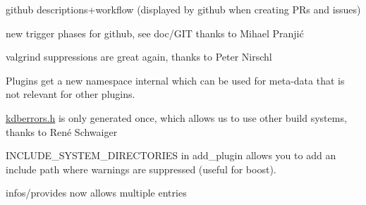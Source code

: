 \begin{DoxyItemize}
\item github descriptions+workflow (displayed by github when creating P\+Rs and issues)
\item new trigger phases for github, see doc/\+G\+IT thanks to Mihael Pranjić
\item valgrind suppressions are great again, thanks to Peter Nirschl
\item Plugins get a new namespace {\ttfamily internal} which can be used for meta-\/data that is not relevant for other plugins.
\item \mbox{\hyperlink{kdberrors_8h}{kdberrors.\+h}} is only generated once, which allows us to use other build systems, thanks to René Schwaiger
\item {\ttfamily I\+N\+C\+L\+U\+D\+E\+\_\+\+S\+Y\+S\+T\+E\+M\+\_\+\+D\+I\+R\+E\+C\+T\+O\+R\+I\+ES} in add\+\_\+plugin allows you to add an include path where warnings are suppressed (useful for boost).
\item {\ttfamily infos/provides} now allows multiple entries
\end{DoxyItemize}


